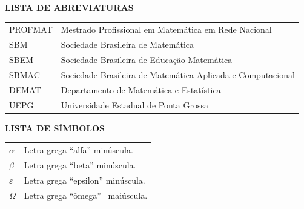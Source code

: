\documentclass[a4paper,12pt]{report}%
\begin{document}
\newpage 

%
%

\thispagestyle{empty}

\begin{center}
  {\normalsize \textnormal{\textbf{LISTA DE ABREVIATURAS}} }
\end{center}

\vspace{0.3cm}

\begin{center}
 \begin{tabular}{p{2.5cm}p{11.5cm}}
  PROFMAT & Mestrado Profissional em Matemática em Rede Nacional \\ 
  SBM  & Sociedade Brasileira de Matemática \\ 
  SBEM & Sociedade Brasileira de Educação Matemática \\ 
  SBMAC & Sociedade Brasileira de Matemática Aplicada e Computacional \\
  DEMAT & Departamento de Matemática e Estatística \\
  UEPG & Universidade Estadual de Ponta Grossa 
 \end{tabular}
\end{center}

\addcontentsline{}{}{}

\newpage

%
%

\thispagestyle{empty}

\begin{center}
  {\normalsize \textnormal{\textbf{LISTA DE SÍMBOLOS}} }
\end{center}

\vspace{0.3cm}

\begin{center}
 \begin{tabular}{p{1.5cm}p{12.5cm}}
  $\alpha$ & Letra grega ``alfa'' minúscula. \\ 
  $\beta$ & Letra grega ``beta'' minúscula. \\ 
  $\varepsilon$ & Letra grega ``epsilon'' minúscula. \\ 
  $\Omega$ & Letra grega ``ômega'' \ maiúscula. 
 \end{tabular}
\end{center}
\end{document}
